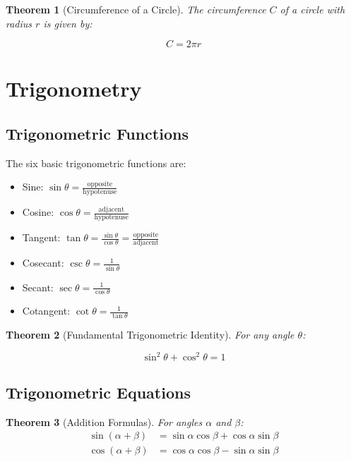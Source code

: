 \documentclass[12pt]{article}
\newif\ifDarkMode
\newcommand{\eqcolor}[1]{\ifDarkMode\textcolor{draculaPurple}{#1}\else#1\fi}
\newcommand{\varcolor}[1]{\ifDarkMode\textcolor{draculaGreen}{#1}\else#1\fi}
\newtheorem{theorem}{Theorem}[section]
\begin{document}
\begin{theorem}[Circumference of a Circle]
The circumference $\varcolor{C}$ of a circle with radius $\varcolor{r}$ is given by:

\[
\eqcolor{C = 2\pi r}
\]
\end{theorem}

\section{\textcolor{draculaCyan}{Trigonometry}}

\subsection{\textcolor{draculaYellow}{Trigonometric Functions}}

The six basic trigonometric functions are:

\begin{itemize}
    \item Sine: $\eqcolor{\sin \theta = \frac{\text{opposite}}{\text{hypotenuse}}}$
    \item Cosine: $\eqcolor{\cos \theta = \frac{\text{adjacent}}{\text{hypotenuse}}}$
    \item Tangent: $\eqcolor{\tan \theta = \frac{\sin \theta}{\cos \theta} = \frac{\text{opposite}}{\text{adjacent}}}$
    \item Cosecant: $\eqcolor{\csc \theta = \frac{1}{\sin \theta}}$
    \item Secant: $\eqcolor{\sec \theta = \frac{1}{\cos \theta}}$
    \item Cotangent: $\eqcolor{\cot \theta = \frac{1}{\tan \theta}}$
\end{itemize}

\begin{theorem}[Fundamental Trigonometric Identity]
For any angle $\varcolor{\theta}$:

\[
\eqcolor{\sin^2 \theta + \cos^2 \theta = 1}
\]
\end{theorem}

\subsection{\textcolor{draculaYellow}{Trigonometric Equations}}

\begin{theorem}[Addition Formulas]
For angles $\varcolor{\alpha}$ and $\varcolor{\beta}$:
\begin{align*}
\eqcolor{\sin(\alpha + \beta)} &= \eqcolor{\sin \alpha \cos \beta + \cos \alpha \sin \beta} \\
\eqcolor{\cos(\alpha + \beta)} &= \eqcolor{\cos \alpha \cos \beta - \sin \alpha \sin \beta}
\end{align*}
\end{theorem}
\end{document}
